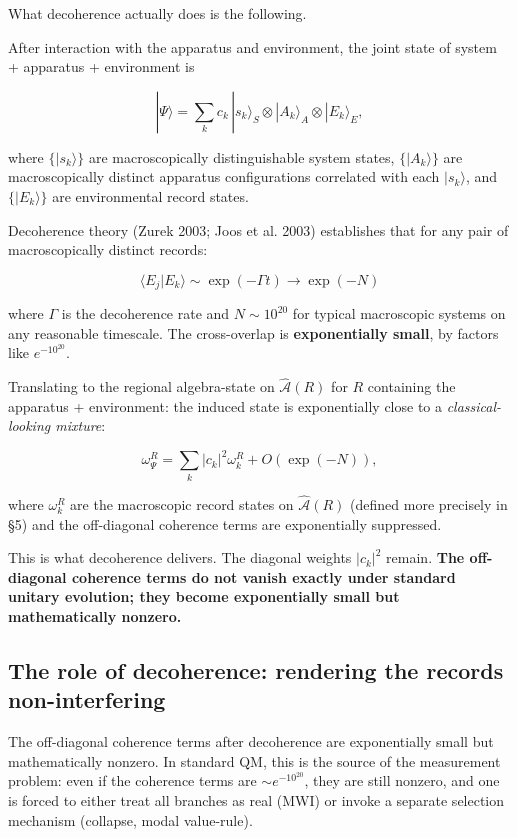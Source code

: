 \documentclass[11pt,a4paper]{article}
\begin{document}
What decoherence actually does is the following.

After interaction with the apparatus and environment, the joint state of system + apparatus + environment is

\[
|\Psi\rangle = \sum_k c_k \,|s_k\rangle_S \otimes |A_k\rangle_A \otimes |E_k\rangle_E,
\]

where $\{|s_k\rangle\}$ are macroscopically distinguishable system states, $\{|A_k\rangle\}$ are macroscopically distinct apparatus configurations correlated with each $|s_k\rangle$, and $\{|E_k\rangle\}$ are environmental record states.

Decoherence theory (Zurek 2003; Joos et al. 2003) establishes that for any pair of macroscopically distinct records:

\[
\langle E_j | E_k \rangle \sim \exp(-\Gamma t) \to \exp(-N)
\]

where $\Gamma$ is the decoherence rate and $N \sim 10^{20}$ for typical macroscopic systems on any reasonable timescale. The cross-overlap is \textbf{exponentially small}, by factors like $e^{-10^{20}}$.

Translating to the regional algebra-state on $\hat{\mathcal{A}}(R)$ for $R$ containing the apparatus + environment: the induced state is exponentially close to a \emph{classical-looking mixture}:

\[
\omega_\Psi^{R} = \sum_k |c_k|^2 \omega_k^R + O(\exp(-N)),
\]

where $\omega_k^R$ are the macroscopic record states on $\hat{\mathcal{A}}(R)$ (defined more precisely in §5) and the off-diagonal coherence terms are exponentially suppressed.

This is what decoherence delivers. The diagonal weights $|c_k|^2$ remain. \textbf{The off-diagonal coherence terms do not vanish exactly under standard unitary evolution; they become exponentially small but mathematically nonzero.}

\subsection{The role of decoherence: rendering the records non-interfering}

The off-diagonal coherence terms after decoherence are exponentially small but mathematically nonzero. In standard QM, this is the source of the measurement problem: even if the coherence terms are $\sim e^{-10^{20}}$, they are still nonzero, and one is forced to either treat all branches as real (MWI) or invoke a separate selection mechanism (collapse, modal value-rule).
\end{document}
